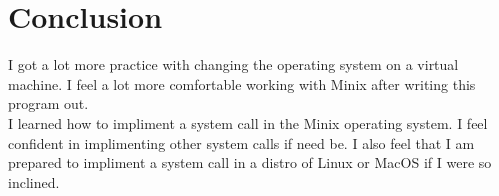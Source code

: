 \documentclass[a4paper, 12pt]{article}
\begin{document}
\section{Conclusion}
I got a lot more practice with changing the operating system on a virtual machine. I feel a lot more comfortable working with Minix after writing this program out.\\
I learned how to impliment a system call in the Minix operating system. I feel confident in implimenting other system calls if need be. I also feel that I am prepared to impliment a system call in a distro of Linux or MacOS if I were so inclined.\\
\end{document}
